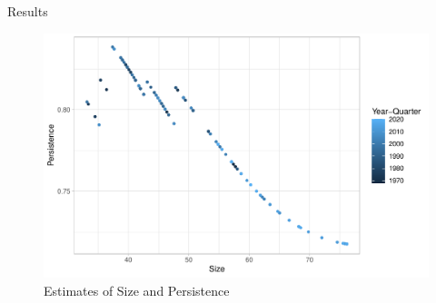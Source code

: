 \documentclass[11pt,pdf,aspectratio=129]{beamer}
\begin{document}
\begin{frame}{Results}{}
    \begin{figure}[!hpbt]\centering
        \begin{minipage}{0.8\textwidth}
          \caption{Estimates of Size and Persistence} 
          \label{fig:size_persistence}
          \includegraphics[width=\linewidth]{size_vs_persistence.pdf}
          \end{minipage}
      
      \end{figure}
    
\end{frame}
\end{document}
